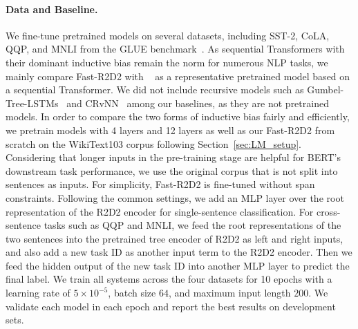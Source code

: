 \paragraph{Data and Baseline.}
We fine-tune pretrained models on several datasets,
including SST-2, CoLA, QQP, and MNLI from the GLUE benchmark~\cite{wang2018glue}.
As sequential Transformers with their dominant inductive bias remain the norm for numerous NLP tasks, 
we mainly compare Fast-R2D2 with \bert~\cite{devlin2018} as a representative pretrained model based on a sequential Transformer. 
We did not include recursive models such as Gumbel-Tree-LSTMs~\cite{DBLP:conf/aaai/ChoiYL18} and CRvNN~\cite{DBLP:conf/icml/ChowdhuryC21} among our baselines, as they are not pretrained models.
In order to compare the two forms of inductive bias fairly and efficiently,
we pretrain \bert models with 4 layers and 12 layers as well as our Fast-R2D2 from scratch on the WikiText103 corpus following Section~\ref{sec:LM_setup}. 
Considering that longer inputs in the pre-training stage are helpful for BERT’s downstream task performance, we use the original corpus that is not split into sentences as inputs.
For simplicity, Fast-R2D2 is fine-tuned without span constraints.
Following the common settings, we add an MLP layer over the root representation of the R2D2 encoder for single-sentence classification. 
For cross-sentence tasks such as QQP and MNLI, we feed the root representations of the two sentences into the pretrained tree encoder of R2D2 as left and right inputs, 
and also add a new task ID as another input term to the R2D2 encoder. 
Then we feed the hidden output of the new task ID into another MLP layer to predict the final label.
We train all systems across the four datasets for 10 epochs 
with a learning rate of $5\times 10^{-5}$, batch size $64$, and maximum input length $200$.
We validate each model in each epoch and report the best results on development sets.

